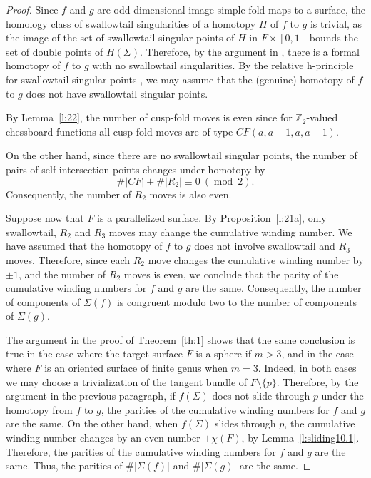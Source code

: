 \documentclass[12pt]{amsart}
\def \Z{\mathbb{Z}}
\def\mod{{\mathop\mathrm{mod}\ }}
\theoremstyle{definition}
\begin{document}
{\begin{proof}
Since $f$ and $g$ are odd dimensional image simple fold maps to a surface, the homology class of swallowtail singularities of a homotopy $H$ of $f$ to $g$ is trivial, as the image of the set of swallowtail singular points of $H$ in $F\times [0,1]$ bounds the set of double points of $H(\Sigma)$. 
Therefore, by the argument in \cite{Sad}, there is a formal homotopy of $f$ to $g$ with no swallowtail singularities.  
   By the relative h-principle for swallowtail singular points  \cite{An}, we may assume that the (genuine) homotopy of $f$ to $g$ does not have swallowtail singular points. 
   
   By Lemma~\ref{l:22}, the number of cusp-fold moves is even since for $\Z_2$-valued chessboard functions all cusp-fold moves are of type $CF(a, a-1, a, a-1)$. %
   
    On the other hand, since there are no swallowtail singular points,  the number of pairs of self-intersection points changes under homotopy by 
  \[
   \#|CF|+\#|R_2|\equiv 0 \ (\mod 2). 
  \]
  Consequently, the number of $R_2$ moves is also even.  
  
  Suppose now that $F$ is a parallelized surface. By Proposition~\ref{l:21a}, only swallowtail, $R_2$ and $R_3$ moves may change the cumulative winding number. We have assumed that the homotopy of $f$ to $g$ does not involve swallowtail and $R_3$ moves. Therefore, since each $R_2$ move changes the cumulative winding number by $\pm 1$, and the number of $R_2$ moves is even, we conclude that the parity of the cumulative winding numbers for $f$ and $g$ are the same. Consequently, the number of components of $\Sigma(f)$ is congruent modulo two to the number of components of $\Sigma(g)$. 
  
 The argument in the proof of Theorem~\ref{th:1} shows that the same conclusion is true in the case where the target surface $F$ is a sphere if $m>3$, and in the case where $F$ is an oriented surface of finite genus when $m=3$. Indeed, in both cases we may choose a trivialization of the tangent bundle of $F\setminus\{p\}$. Therefore, by the argument in the previous paragraph, if $f(\Sigma)$ does not slide through $p$ under the homotopy from $f$ to $g$, the parities of the cumulative winding numbers for $f$ and $g$ are the same. On the other hand, when $f(\Sigma)$ slides through $p$, the cumulative winding number changes by an even number $\pm \chi(F)$, by Lemma~\ref{l:sliding10.1}. Therefore, the parities of the cumulative winding numbers for $f$ and $g$ are the same. Thus, the parities of $\#|\Sigma(f)|$ and $\#|\Sigma(g)|$ are the same. 
  \end{proof}
 
}
\end{document}

